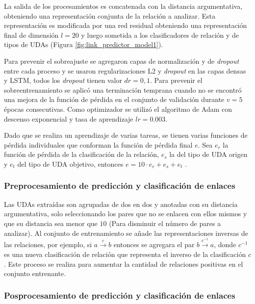 \documentclass{rcci} %
\begin{document}
La salida de los procesamientos es concatenada con la distancia argumentativa, obteniendo una representaci\'on 
conjunta de la relaci\'on a analizar. Esta representaci\'on es modificada por una red residual obteniendo
una representaci\'on final de dimensi\'on $l=20$ y luego sometida a los clasificadores de relaci\'on y de tipos de UDAs
(Figura \ref{fig:link_predictor_model1}).

Para prevenir el sobreajuste se agregaron capas de normalizaci\'on y de \textit{dropout} entre cada 
proceso y se usaron regularizaciones L2 y \textit{dropout} en las capas densas y LSTM, 
todos los \textit{dropout} tienen valor $dr=0,1$. Para prevenir el sobreentrenamiento se aplic\'o una 
terminaci\'on temprana cuando no se encontr\'o una mejora de la funci\'on de p\'erdida en el 
conjunto de validaci\'on durante $v=5$ \'epocas consecutivas. Como optimizador se utiliz\'o el algoritmo de Adam con descenso 
exponencial y tasa de aprendizaje $lr=0.003$.

Dado que se realiza un aprendizaje de varias tareas, se tienen varias funciones de p\'erdida individuales que conforman 
la funci\'on de p\'erdida final $e$. Sea $e_r$ la funci\'on de p\'erdida de la clasificaci\'on de la relaci\'on, $e_s$ la del tipo de UDA origen  
y $e_t$ del tipo de UDA objetivo, entonces $e = 10 \cdot e_r + e_s + e_t$ \citep{galassi2021deep}.

\subsubsection*{Preprocesamiento de predicci\'on y clasificaci\'on de enlaces}

Las UDAs extra\'idas son agrupadas de dos en dos y anotadas con su distancia argumentativa, solo seleccionando
los pares que no se enlacen con ellos mismos y que su distancia sea menor que $10$ (Para disminuir el n\'umero 
de pares a analizar). Al conjunto de entrenamiento se a\~nade las representaciones inversas de las relaciones, por ejemplo, si $a \xrightarrow{c} b$ entonces 
se agregara el par $b \xrightarrow{c^{-1}} a$, donde $c^{-1}$ es una nueva clasificaci\'on de relaci\'on que representa
el inverso de la clasificaci\'on $c$. Este proceso se realiza para aumentar la cantidad de relaciones positivas en el
conjunto entrenante.

\subsubsection*{Posprocesamiento de predicci\'on y clasificaci\'on de enlaces}
\end{document}
